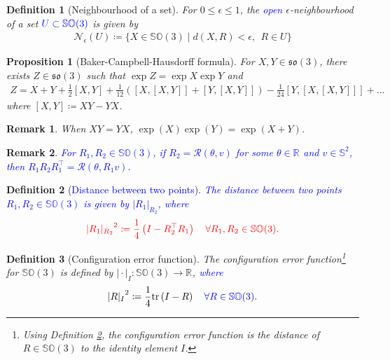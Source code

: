 \documentclass{article}
\newcommand{\SOthree}{\mathbb{SO}(3)}
\newcommand{\sothree}{\mathfrak{so}(3)}
\newcommand{\R}[1]{\mathbb{R}^{#1}}
\newtheorem{remark}{Remark}
\newtheorem{definition}{Definition}
\newtheorem{proposition}{Proposition}
\newcommand{\trace}[1]{\text{tr}\left(#1\right)}
\newcommand{\brackets}[1]{\left(#1\right)}
\newcommand{\textblue}[1]{\textcolor{blue}{#1}}
\newcommand{\normSOthree}[1]{{{\vert}#1 {\vert}_I}}
\newcommand{\neighbourhood}[2]{\mathcal{N}_{#1}(#2)}
\begin{document}
\begin{definition}[Neighbourhood of a set]
    For $0 \leq \epsilon \leq 1$, the \textblue{open} $\epsilon$-neighbourhood of a set $\textblue{U\subset\SOthree}$ is given by 
    \begin{align*}
        \neighbourhood{\epsilon}{U} \coloneqq \{X\in\SOthree \mid d(X, R) < \epsilon,\:\:  R\in U\}
    \end{align*}
\end{definition}

\begin{proposition}[Baker-Campbell-Hausdorff formula]
For $X,Y\in \sothree$, there exists $ Z\in\sothree$ such that $\exp{Z} = \exp{X}\exp{Y}$ and 
\begin{align*}
    Z = X + Y + \frac{1}{2}[X, Y] + \frac{1}{12}\brackets{[X,[X,Y]] + [Y, [X,Y]]} - \frac{1}{24}[Y,[X,[X,Y]]] + ...
\end{align*}
where $[X,Y]\coloneqq XY - YX$. 
\end{proposition}

\begin{remark} \label{remark:baker-campbell-hausdorff}
When $XY = YX$, $\exp(X)\exp{(Y)} = \exp{(X+Y)}$. 
\end{remark}

\begin{remark}\label{remark:axis}
    \textblue{For $R_1, R_2\in\SOthree$, if $R_2 = \mathcal{R}(\theta, v)$ for some $\theta\in\R{}$ and $v\in\mathbb{S}^2$, then $R_1R_2R_1^\top = \mathcal{R}(\theta, R_1 v)$. }
\end{remark}

\begin{definition}[\textblue{Distance between two points}]\label{def:dist_between_points}
    \textblue{The distance between two points $R_1, R_2\in\SOthree$  is given by $|R_1|_{R_2}$, where }
    \begin{align*}
        \textcolor{red}{{|R_1|_{R_2}}^2 \coloneqq \frac{1}{4}\brackets{I - R_2^\top R_1} \quad \forall R_1, R_2 \in \SOthree.}
    \end{align*}
\end{definition}

\begin{definition}[Configuration error function]\label{def:config_err}
    The configuration error function\footnote{Using Definition \ref{def:dist_between_points}, the configuration error function is the distance of $R\in\SOthree$ to the identity element $I$.} for $\SOthree$ is defined by $\normSOthree{\cdot}: \SOthree \to \R{}$, \textblue{where} \textcolor{red}{\[{\normSOthree{R}^2 \coloneqq \frac{1}{4}\trace{I - {R}} \quad \textblue{\forall R\in\SOthree}}.\]}
\end{definition}
\end{document}
